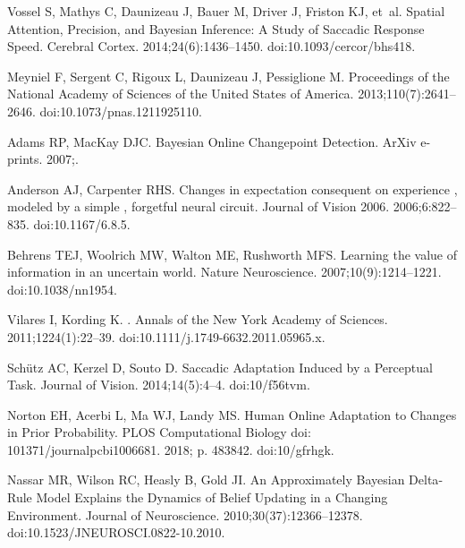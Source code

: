 \documentclass[10pt,letterpaper]{article}
\begin{document}
\begin{thebibliography}{10}
Vossel S, Mathys C, Daunizeau J, Bauer M, Driver J, Friston KJ, et~al.
\newblock Spatial {Attention}, {Precision}, and {Bayesian} {Inference}: {A}
  {Study} of {Saccadic} {Response} {Speed}.
\newblock Cerebral Cortex. 2014;24(6):1436--1450.
\newblock doi:{10.1093/cercor/bhs418}.

Meyniel F, Sergent C, Rigoux L, Daunizeau J, Pessiglione M.
\newblock Proceedings of the National Academy of Sciences of the United States
  of America. 2013;110(7):2641--2646.
\newblock doi:{10.1073/pnas.1211925110}.

Adams RP, MacKay DJC.
\newblock Bayesian Online Changepoint Detection.
\newblock ArXiv e-prints. 2007;.

Anderson AJ, Carpenter RHS.
\newblock Changes in expectation consequent on experience , modeled by a simple
  , forgetful neural circuit.
\newblock Journal of Vision 2006. 2006;6:822--835.
\newblock doi:{10.1167/6.8.5}.

Behrens TEJ, Woolrich MW, Walton ME, Rushworth MFS.
\newblock Learning the value of information in an uncertain world.
\newblock Nature Neuroscience. 2007;10(9):1214--1221.
\newblock doi:{10.1038/nn1954}.

Vilares I, Kording K.
.
\newblock Annals of the New York Academy of Sciences. 2011;1224(1):22--39.
\newblock doi:{10.1111/j.1749-6632.2011.05965.x}.

Sch{\"u}tz AC, Kerzel D, Souto D.
\newblock Saccadic Adaptation Induced by a Perceptual Task.
\newblock Journal of Vision. 2014;14(5):4--4.
\newblock doi:{10/f56tvm}.

Norton EH, Acerbi L, Ma WJ, Landy MS.
\newblock Human Online Adaptation to Changes in Prior Probability.
\newblock PLOS Computational Biology doi: 101371/journalpcbi1006681. 2018; p.
  483842.
\newblock doi:{10/gfrhgk}.

Nassar MR, Wilson RC, Heasly B, Gold JI.
\newblock An {{Approximately Bayesian Delta}}-{{Rule Model Explains}} the
  {{Dynamics}} of {{Belief Updating}} in a {{Changing Environment}}.
\newblock Journal of Neuroscience. 2010;30(37):12366--12378.
\newblock doi:{10.1523/JNEUROSCI.0822-10.2010}.


\end{thebibliography}
\end{document}
